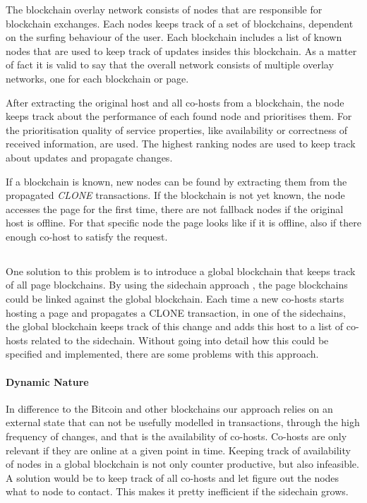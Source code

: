 
The blockchain overlay network consists of nodes that are responsible for
blockchain exchanges. Each nodes keeps track of a set of blockchains,
dependent on the surfing behaviour of the user. Each blockchain includes a
list of known nodes that are used to keep track of updates insides this
blockchain. As a matter of fact it is valid to say that the overall network
consists of multiple overlay networks, one for each blockchain or page.

After extracting the original host and all co-hosts from a blockchain, the
node keeps track about the performance of each found node and prioritises
them. For the prioritisation quality of service properties, like availability
or correctness of received information, are used. The highest ranking nodes
are used to keep track about updates and propagate changes.

If a blockchain is known, new nodes can be found by extracting them from the
propagated \textit{CLONE} transactions. If the blockchain is not yet known,
the node accesses the page for the first time, there are not fallback nodes if
the original host is offline. For that specific node the page looks like if it
is offline, also if there enough co-host to satisfy the request.

\subsection{\color{red}{[REJECTED] Solution 1: Global Blockchain}}

One solution to this problem is to introduce a global blockchain that keeps
track of all page blockchains. By using the sidechain approach
\cite{back2014enabling}, the page blockchains could be linked against the
global blockchain. Each time a new co-hosts starts hosting a page and
propagates a CLONE transaction, in one of the sidechains, the global
blockchain  keeps track of this change and adds this host to a list of co-
hosts related to the sidechain. Without going into detail how this could be
specified and implemented, there are some problems with this approach.

\paragraph{Dynamic Nature}
In difference to the Bitcoin and other blockchains our
approach relies on an external state that can not be usefully modelled in
transactions, through the high frequency of changes, and that is the
availability of co-hosts. Co-hosts are only relevant if they are online at a
given point in time. Keeping track of availability of nodes in a global
blockchain is not only counter productive, but also infeasible. A solution
would be to keep track of all co-hosts and let figure out the nodes what to
node to contact. This makes it pretty inefficient if the sidechain grows.

